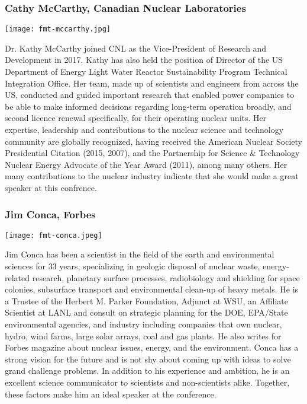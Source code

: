 \subsubsection{Cathy McCarthy, Canadian Nuclear Laboratories}
\begin{minipage}{0.25\textwidth}
	\centering
	\texttt{[image: fmt-mccarthy.jpg]}
\end{minipage}
\begin{minipage}{0.73\textwidth}
	Dr. Kathy McCarthy joined CNL as the Vice-President of Research and Development in 2017. Kathy has also held the position of Director of the US Department of Energy Light Water Reactor Sustainability Program Technical Integration Office. Her team, made up of scientists and engineers from across the US, conducted and guided important research that enabled power companies to be able to make informed decisions regarding long-term operation broadly, and second licence renewal specifically, for their operating nuclear units. Her expertise, leadership and contributions to the nuclear science and technology community are globally recognized, having received the American Nuclear Society Presidential Citation (2015, 2007), and the Partnership for Science \& Technology Nuclear Energy Advocate of the Year Award (2011), among many others. Her many contributions to the nuclear industry indicate that she would make a great speaker at this confrence. 
\end{minipage}


\subsubsection{Jim Conca, Forbes}
\begin{minipage}{0.25\textwidth}
	\centering
	\texttt{[image: fmt-conca.jpeg]}
\end{minipage}
\begin{minipage}{0.73\textwidth}
	Jim Conca has been a scientist in the field of the earth and environmental sciences for 33 years, specializing in geologic disposal of nuclear waste, energy-related research, planetary surface processes, radiobiology and shielding for space colonies, subsurface transport and environmental clean-up of heavy metals. He is a Trustee of the Herbert M. Parker Foundation, Adjunct at WSU, an Affiliate Scientist at LANL and consult on strategic planning for the DOE, EPA/State environmental agencies, and industry including companies that own nuclear, hydro, wind farms, large solar arrays, coal and gas plants. He also writes for Forbes magazine about nuclear issues, energy, and the environment. Conca has a strong vision for the future and is not shy about coming up with ideas to solve grand challenge problems. In addition to his experience and ambition, he is an excellent science communicator to scientists and non-scientists alike. Together, these factors make him an ideal speaker at the conference.
\end{minipage}


